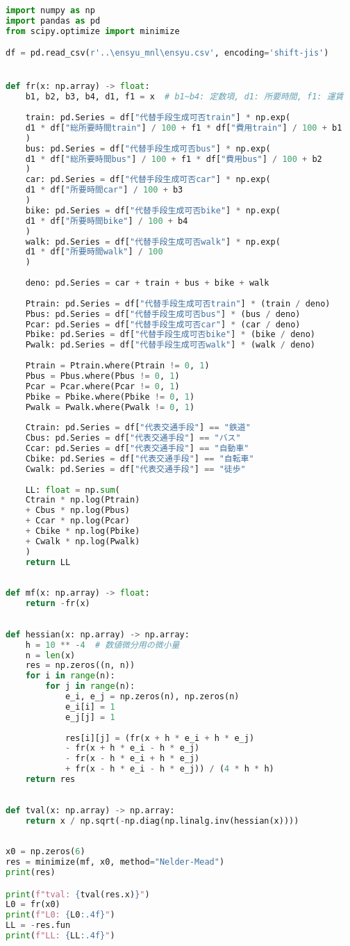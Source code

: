 \begin{lstlisting}[language=Python]
import numpy as np
import pandas as pd
from scipy.optimize import minimize

df = pd.read_csv(r'..\ensyu_mnl\ensyu.csv', encoding='shift-jis')


def fr(x: np.array) -> float:
    b1, b2, b3, b4, d1, f1 = x  # b1~b4: 定数項, d1: 所要時間, f1: 運賃
    
    train: pd.Series = df["代替手段生成可否train"] * np.exp(
    d1 * df["総所要時間train"] / 100 + f1 * df["費用train"] / 100 + b1
    )
    bus: pd.Series = df["代替手段生成可否bus"] * np.exp(
    d1 * df["総所要時間bus"] / 100 + f1 * df["費用bus"] / 100 + b2
    )
    car: pd.Series = df["代替手段生成可否car"] * np.exp(
    d1 * df["所要時間car"] / 100 + b3
    )
    bike: pd.Series = df["代替手段生成可否bike"] * np.exp(
    d1 * df["所要時間bike"] / 100 + b4
    )
    walk: pd.Series = df["代替手段生成可否walk"] * np.exp(
    d1 * df["所要時間walk"] / 100
    )
    
    deno: pd.Series = car + train + bus + bike + walk
    
    Ptrain: pd.Series = df["代替手段生成可否train"] * (train / deno)
    Pbus: pd.Series = df["代替手段生成可否bus"] * (bus / deno)
    Pcar: pd.Series = df["代替手段生成可否car"] * (car / deno)
    Pbike: pd.Series = df["代替手段生成可否bike"] * (bike / deno)
    Pwalk: pd.Series = df["代替手段生成可否walk"] * (walk / deno)
    
    Ptrain = Ptrain.where(Ptrain != 0, 1)
    Pbus = Pbus.where(Pbus != 0, 1)
    Pcar = Pcar.where(Pcar != 0, 1)
    Pbike = Pbike.where(Pbike != 0, 1)
    Pwalk = Pwalk.where(Pwalk != 0, 1)
    
    Ctrain: pd.Series = df["代表交通手段"] == "鉄道"
    Cbus: pd.Series = df["代表交通手段"] == "バス"
    Ccar: pd.Series = df["代表交通手段"] == "自動車"
    Cbike: pd.Series = df["代表交通手段"] == "自転車"
    Cwalk: pd.Series = df["代表交通手段"] == "徒歩"
    
    LL: float = np.sum(
    Ctrain * np.log(Ptrain)
    + Cbus * np.log(Pbus)
    + Ccar * np.log(Pcar)
    + Cbike * np.log(Pbike)
    + Cwalk * np.log(Pwalk)
    )
    return LL
    
    
def mf(x: np.array) -> float:
    return -fr(x)
    
    
def hessian(x: np.array) -> np.array:
    h = 10 ** -4  # 数値微分用の微小量
    n = len(x)
    res = np.zeros((n, n))
    for i in range(n):
        for j in range(n):
            e_i, e_j = np.zeros(n), np.zeros(n)
            e_i[i] = 1
            e_j[j] = 1
            
            res[i][j] = (fr(x + h * e_i + h * e_j)
            - fr(x + h * e_i - h * e_j)
            - fr(x - h * e_i + h * e_j)
            + fr(x - h * e_i - h * e_j)) / (4 * h * h)
    return res
    
    
def tval(x: np.array) -> np.array:
    return x / np.sqrt(-np.diag(np.linalg.inv(hessian(x))))
    
    
x0 = np.zeros(6)
res = minimize(mf, x0, method="Nelder-Mead")
print(res)

print(f"tval: {tval(res.x)}")
L0 = fr(x0)
print(f"L0: {L0:.4f}")
LL = -res.fun
print(f"LL: {LL:.4f}")
\end{lstlisting}
